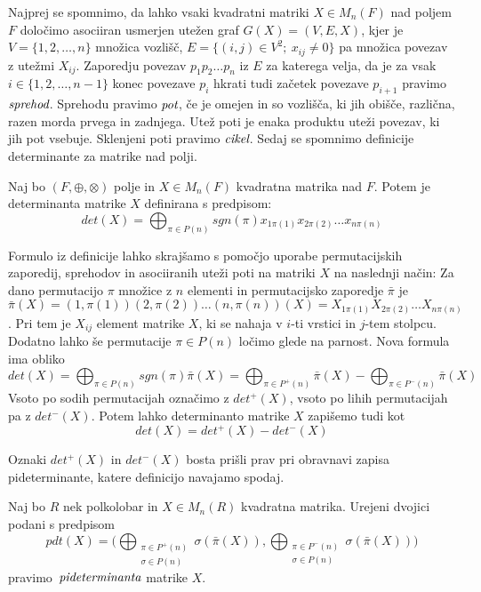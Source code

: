 \documentclass[mat1]{fmfdelo}
\newcommand{\pojem}[1]{\ensuremath{\emph{#1}}}
\begin{document}
Najprej se spomnimo, da lahko vsaki kvadratni matriki $X\in M_n(F)$ nad poljem $F$ določimo asociiran usmerjen utežen graf $G(X) = (V, E, X)$, kjer je $V= \{1, 2, \ldots, n\}$ množica vozlišč, $E=\{(i, j)\in V^2;~x_{ij}\neq 0\}$ pa množica povezav z utežmi $X_{ij}$. Zaporedju povezav $p_1p_2\ldots p_n$ iz $E$ za katerega velja, da je za vsak $i\in \{1, 2, \ldots, n-1\}$ konec povezave $p_i$ hkrati tudi začetek povezave $p_{i+1}$ pravimo \pojem{sprehod}. Sprehodu pravimo \pojem{pot}, če je omejen in so vozlišča, ki jih obišče, različna, razen morda prvega in zadnjega. Utež poti je enaka produktu uteži povezav, ki jih pot vsebuje. Sklenjeni poti pravimo \pojem{cikel}. 
Sedaj se spomnimo definicije determinante za matrike nad polji. 
\begin{definicija}
	Naj bo $(F, \oplus, \otimes)$ polje in $X\in M_n(F)$ kvadratna matrika nad $F$. Potem je determinanta matrike $X$ definirana s predpisom: $$det(X) = \bigoplus_{\pi\in P(n)}sgn(\pi)x_{1\pi(1)}x_{2\pi(2)}\ldots x_{n\pi(n)}$$
\end{definicija}
Formulo iz definicije lahko skrajšamo s pomočjo uporabe permutacijskih zaporedij, sprehodov in asociiranih uteži poti na matriki $X$ na naslednji način:
Za dano permutacijo $\pi$ množice z $n$ elementi in permutacijsko zaporedje $\bar{\pi}$ je $\bar{\pi}(X) = (1, \pi(1))(2, \pi(2))\ldots (n, \pi(n))(X) = X_{1\pi(1)}X_{2\pi(2)}\ldots X_{n\pi(n)}$. Pri tem je $X_{ij}$ element matrike $X$, ki se nahaja v $i$-ti vrstici in $j$-tem stolpcu.
Dodatno lahko še permutacije $\pi\in P(n)$ ločimo glede na parnost. Nova formula ima obliko $$det(X) = \bigoplus_{\pi\in P(n)}sgn(\pi)\bar{\pi}(X) = \bigoplus_{\pi\in P^{+}(n)}\bar{\pi}(X) - \bigoplus_{\pi\in P^{-}(n)}\bar{\pi}(X)$$
Vsoto po sodih permutacijah označimo z $det^{+}(X)$, vsoto po lihih permutacijah pa z $det^{-}(X)$. Potem lahko determinanto matrike $X$ zapišemo tudi kot $$det(X) = det^{+}(X) - det^{-}(X)$$

Oznaki $det^{+}(X)$ in $det^{-}(X)$ bosta prišli prav pri obravnavi zapisa pideterminante, katere definicijo navajamo spodaj.

\begin{definicija}
	Naj bo $R$ nek polkolobar in $X\in M_n(R)$ kvadratna matrika. Urejeni dvojici podani s predpisom $$pdt(X) = \big(\bigoplus_{\substack{\pi\in P^{+}(n) \\ \sigma\in P(n)}}\sigma(\bar{\pi}(X)), \bigoplus_{\substack{\pi\in P^{-}(n) \\ \sigma\in P(n)}}\sigma(\bar{\pi}(X))\big)$$ pravimo~\pojem{pideterminanta} matrike $X$. 
\end{definicija}
\end{document}
